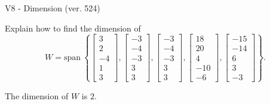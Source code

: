 \begin{exercise}
  \begin{exerciseTitle}V8 - Dimension (ver. 524)\end{exerciseTitle}
  \begin{exerciseStatement}
    Explain how to find the dimension of 
\[W=\mathrm{span}\ \left\{\left[\begin{array}{r}
3 \\
2 \\
-4 \\
1 \\
3
\end{array}\right] , \left[\begin{array}{r}
-3 \\
-4 \\
-3 \\
3 \\
3
\end{array}\right] , \left[\begin{array}{r}
-3 \\
-4 \\
-3 \\
3 \\
3
\end{array}\right] , \left[\begin{array}{r}
18 \\
20 \\
4 \\
-10 \\
-6
\end{array}\right] , \left[\begin{array}{r}
-15 \\
-14 \\
6 \\
3 \\
-3
\end{array}\right]\right\}.\]



  \end{exerciseStatement}
  \begin{exerciseAnswer}
   The dimension of \(W\) is  \(2\).
  


  \end{exerciseAnswer}
\end{exercise}